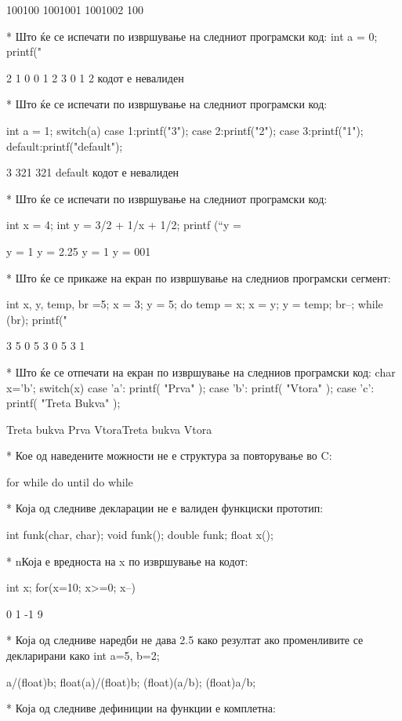 {100100
1001001
1001002
100

* Што ќе се испечати по извршување на следниот програмски код:
int a = 0; 
printf(" %

2 1 0
0 1 2 3
0 1 2
кодот е невалиден


* Што ќе се испечати по извршување на следниот програмски код:

int a = 1; 
switch(a)
{
             case 1:printf("3");
             case 2:printf("2");
             case 3:printf("1");
             default:printf("default");
}

3
321
321 default      
кодот е невалиден

* Што ќе се испечати по извршување на следниот програмски код:

int x = 4;
int y = 3/2 + 1/x + 1/2;
printf (“y = %

y = 1
y = 2.25
y = 1
y = 001

* Што ќе се прикаже на екран по извршување на следниов програмски сегмент: 

int x, y, temp, br =5;
x = 3; y = 5;
    do {
            temp = x; x = y; y = temp;
        br--;       
        }
    while (br);
    printf("%

3 5 0
5 3 0
5 3 1    
                             
* Што ќе се отпечати на екран по извршување на следниов програмски код:
char x='b';
switch(x)
{
  case 'a': printf( "Prva" );
  case 'b': printf( "Vtora" );
  case 'c': printf( "Treta Bukva" );
}

Treta bukva
Prva
VtoraTreta bukva
Vtora   

* Кое од наведените можности не е структура за повторување во C:

for
while
do until
do while

* Која од следниве декларации не е валиден функциски прототип:

int funk(char, char);
void funk();
double funk;
float x();

* nКоја е вредноста на x по извршување на кодот: 

int x; for(x=10; x>=0; x--) {} 

0
1
-1
9

* Која од следниве наредби не дава 2.5 како резултат ако променливите се
декларирани како int a=5, b=2;

a/(float)b;
float(a)/(float)b;
(float)(a/b);
(float)a/b;

* Која од следниве дефиниции на функции е комплетна:

}
